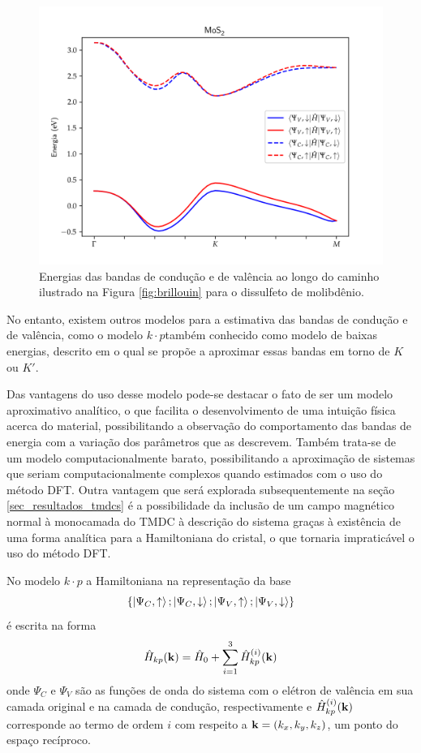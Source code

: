 \begin{figure}[h]
  \centering
  \includegraphics[width=\textwidth]{imagens/mos2_bands.png}
  \caption{
    Energias das bandas de condução e de valência ao longo do caminho ilustrado
    na Figura \ref{fig:brillouin} para o dissulfeto de molibdênio.
  }
  \label{fig:mos2_bands}
\end{figure}

No entanto, existem outros modelos para a estimativa das bandas de condução e de
valência, como o modelo $k \cdot p$\trav também conhecido como modelo de baixas
energias, descrito em \cite{liu2013tmdc}\trav o qual se propõe a aproximar essas
bandas em torno de $K$ ou $K'$.

Das vantagens do uso desse modelo pode-se destacar o fato de ser um modelo
aproximativo analítico, o que facilita o desenvolvimento de uma intuição física
acerca do material, possibilitando a observação do comportamento das bandas de
energia com a variação dos parâmetros que as descrevem. Também trata-se de um
modelo computacionalmente barato, possibilitando a aproximação de sistemas que
seriam computacionalmente complexos quando estimados com o uso do método DFT.
Outra vantagem que será explorada subsequentemente na seção
\ref{sec_resultados_tmdcs} é a possibilidade da inclusão de um campo magnético
normal à monocamada do TMDC à descrição do sistema graças à existência de uma
forma analítica para a Hamiltoniana do cristal, o que tornaria impraticável
o uso do método DFT.

No modelo $ k \cdot p $ a Hamiltoniana na representação da base
\begin{equation}
  \left\{ \ket{\Psi_C,\uparrow} ; \ket{\Psi_C,\downarrow} ; \ket{\Psi_V,\uparrow} ; \ket{\Psi_V,\downarrow} \right\}
  \label{eq:basis}
\end{equation}
é escrita na forma
\begin{equation}
  \hat{H}_{kp}(\mathbf{k}) = \hat{H}_0 + \sum_{i=1}^3 \hat{H}_{kp}^{(i)}(\mathbf{k})
  \label{eq:total_ham}
\end{equation}
onde $ \Psi_C $ e $ \Psi_V $ são as funções de onda do sistema com o elétron de
valência em sua camada original e na camada de condução, respectivamente e 
$ \hat{H}_{kp}^{(i)}(\mathbf{k}) $ corresponde ao termo de ordem $ i $ com respeito
a $ \mathbf{k} = (k_x, k_y, k_z) $, um ponto do espaço recíproco. 

